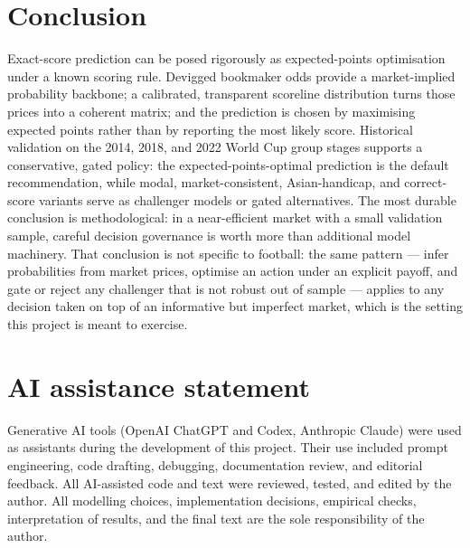 \documentclass[11pt]{article}
\begin{document}
\section{Conclusion}

Exact-score prediction can be posed rigorously as expected-points optimisation under a known
scoring rule. Devigged bookmaker odds provide a market-implied probability backbone; a
calibrated, transparent scoreline distribution turns those prices into a coherent matrix; and
the prediction is chosen by maximising expected points rather than by reporting the most likely
score. Historical validation on the 2014, 2018, and 2022 World Cup group stages supports a
conservative, gated policy: the expected-points-optimal prediction is the default recommendation, while
modal, market-consistent, Asian-handicap, and correct-score variants serve as challenger
models or gated alternatives. The most durable conclusion is methodological: in a
near-efficient market with a small validation sample, careful decision governance is worth more
than additional model machinery. That conclusion is not specific to football: the same pattern
--- infer probabilities from market prices, optimise an action under an explicit payoff, and gate
or reject any challenger that is not robust out of sample --- applies to any decision taken on top
of an informative but imperfect market, which is the setting this project is meant to exercise.

\section*{AI assistance statement}

Generative AI tools (OpenAI ChatGPT and Codex, Anthropic Claude) were used as assistants
during the development of this project. Their use included prompt engineering, code drafting, debugging,
documentation review, and editorial feedback. All AI-assisted code and text were reviewed,
tested, and edited by the author. All modelling choices, implementation decisions, empirical
checks, interpretation of results, and the final text are the sole responsibility of the author.

\clearpage


\end{document}
